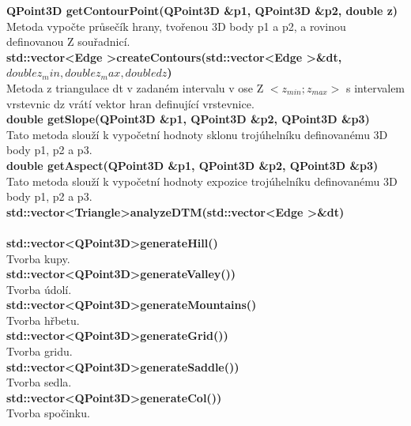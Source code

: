 \documentclass[a4paper, 12pt]{article}
\begin{document}
\textbf{QPoint3D getContourPoint(QPoint3D \&p1, QPoint3D \&p2, double z)}\\
Metoda vypočte průsečík hrany, tvořenou 3D body p1 a p2, a rovinou definovanou Z souřadnicí.\\

\textbf{std::vector\textless Edge \textgreater createContours(std::vector\textless Edge \textgreater \&dt, $double z_min, double z_max, double dz$)}\\
Metoda z triangulace dt v zadaném intervalu v ose Z $<z_{min} ; z_{max}>$ s intervalem vrstevnic dz vrátí vektor hran definující vrstevnice.\\

\textbf{double getSlope(QPoint3D \&p1, QPoint3D \&p2, QPoint3D \&p3)}\\
Tato metoda slouží k vypočetní hodnoty sklonu trojúhelníku definovanému 3D body p1, p2 a p3.\\

\textbf{double getAspect(QPoint3D \&p1, QPoint3D \&p2, QPoint3D \&p3)}\\
Tato metoda slouží k vypočetní hodnoty expozice trojúhelníku definovanému 3D body p1, p2 a p3.\\

\textbf{std::vector\textless Triangle\textgreater analyzeDTM(std::vector\textless Edge \textgreater \&dt)}\\
\\

\textbf{std::vector\textless QPoint3D\textgreater generateHill()}\\
Tvorba kupy.\\

\textbf{std::vector\textless QPoint3D\textgreater generateValley())}\\
Tvorba údolí.\\

\textbf{std::vector\textless QPoint3D\textgreater generateMountains()}\\
Tvorba hřbetu.\\

\textbf{std::vector\textless QPoint3D\textgreater generateGrid())}\\
Tvorba gridu.\\

\textbf{std::vector\textless QPoint3D\textgreater generateSaddle())}\\
Tvorba sedla.\\

\textbf{std::vector\textless QPoint3D\textgreater generateCol())}\\
Tvorba spočinku.\\
\end{document}
